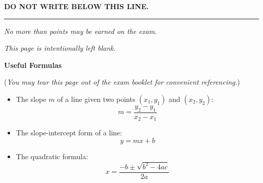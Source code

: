 \documentclass[addpoints,12pt,answers]{exam}
\begin{document}
\vfill

\bigskip
\centerline{\textbf{DO NOT WRITE BELOW THIS LINE.}}
\rule{\textwidth}{.2mm}

\vfill

\begin{center}
	\gradetable[v][pages]
	
	\vspace{12pt}
	\textit{No more than \numpoints{} points may be earned on the exam.}
	
\end{center}

\vfill

\newpage
\phantom{.}
\vfill
\begin{center}
   \textit{This page is intentionally left blank}.
\end{center}
\vfill

\newpage

\begin{center}
   {\Large \textbf{Useful Formulas}}
\end{center}

(\textit{You may tear this page out of the exam booklet for convenient referencing.})

\begin{itemize}
   \item The slope $m$ of a line given two points $(x_1,y_1)$ and $(x_2,y_2)$: 
   \[m = \frac{y_2-y_1}{x_2-x_1}\]
   \item The slope-intercept form of a line:
   \[y=mx+b\]
   \item The quadratic formula:
   \[x = \frac{-b\pm\sqrt{b^2-4ac}}{2a}\]
\end{itemize}
\end{document}
